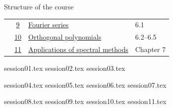 \documentclass[aspectratio=169,11pt,notheorems]{beamer}
\begin{document}
\begin{frame}{Structure of the course}
\begin{tabular}{@{}lcll@{}}
                                                & \hyperlink{session09}{9}  & \hyperlink{session09}{Fourier series}                                 & 6.1          \\
                                                & \hyperlink{session10}{10} & \hyperlink{session10}{Orthogonal polynomials}                         & 6.2--6.5     \\
                                                & \hyperlink{session11}{11} & \hyperlink{session11}{Applications of spectral methods}               & Chapter 7    \\
    \bottomrule
  \end{tabular}
\end{frame}


{session01.tex}
{session02.tex}
{session03.tex}


{session04.tex}
{session05.tex}
{session06.tex}
{session07.tex}


{session08.tex}
{session09.tex}
{session10.tex}
{session11.tex}
\end{document}
